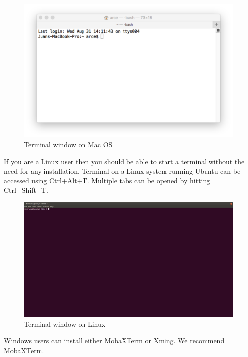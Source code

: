 \documentclass[11pt]{article}
\makeatletter
\def\maxwidth{\ifdim\Gin@nat@width>\linewidth\linewidth
    \else\Gin@nat@width\fi}
\let\Oldincludegraphics\includegraphics
\renewcommand{\includegraphics}[1]{\Oldincludegraphics[width=.8\maxwidth]{#1}}
\makeatother
\begin{document}
\begin{figure}
\centering
\includegraphics{./figures/terminal-mac.png}
\caption{Terminal window on Mac OS}
\end{figure}

If you are a Linux user then you should be able to start a terminal
without the need for any installation. Terminal on a Linux system
running Ubuntu can be accessed using Ctrl+Alt+T. Multiple tabs can be
opened by hitting Ctrl+Shift+T.

\begin{figure}
\centering
\includegraphics{./figures/Ubuntu-terminal.png}
\caption{Terminal window on Linux}
\end{figure}

Windows users can install either
\href{http://mobaxterm.mobatek.net/}{MobaXTerm} or
\href{http://www.straightrunning.com/XmingNotes/}{Xming}. We recommend
MobaXTerm.
\end{document}
